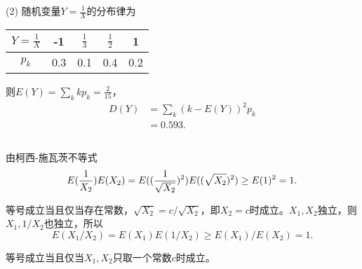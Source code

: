 \documentclass[UTF8,a4paper,10pt]{ctexart}
\begin{document}
(2) 随机变量$Y = \displaystyle\frac{1}{X}$的分布律为
\begin{center}
    \begin{tabular}{c|cccc}
        $Y = \frac{1}{X}$ & -1 & $\frac{1}{3}$ & $\frac{1}{2}$ & 1 \\
        \hline
        $p_k$ & 0.3 & 0.1 & 0.4 & 0.2 
    \end{tabular}
\end{center}

则$E(Y) = \displaystyle\sum_{k}kp_k = \displaystyle\frac{2}{15}$，
\begin{align}
    D(Y) &= \sum_k (k - E(Y))^2p_k \nonumber \\
         &= 0.593.
\end{align}

\subsection{}
由柯西-施瓦茨不等式
\begin{equation}
    E({1\over X_2}) E(X_2) = E(({1\over \sqrt{X_2}})^2) E((\sqrt{X_2})^2)\geq E(1)^2 = 1.
\end{equation}

等号成立当且仅当存在常数，$\sqrt{X_2} = c/\sqrt{X_2}$，即$X_2=c$时成立。$X_1,X_2$独立，则$X_1, 1/X_2$也独立，所以
\begin{equation}
    E(X_1/X_2) = E(X_1)E(1/X_2) \geq E(X_1)/E(X_2) = 1.
\end{equation}

等号成立当且仅当$X_1, X_2$只取一个常数$c$时成立。
\end{document}
